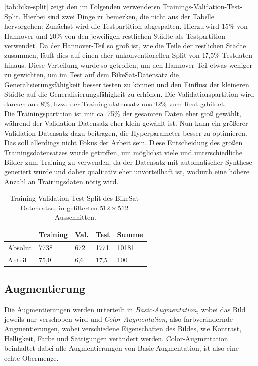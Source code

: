 \autoref{tab:bike-split} zeigt den im Folgenden verwendeten Trainings-Validation-Test-Split. 
Hierbei sind zwei Dinge zu bemerken, die nicht aus der Tabelle hervorgehen: 
Zunächst wird die Testpartition abgespalten. Hierzu wird 15\% von Hannover und 
20\% von den jeweiligen restlichen Städte als Testpartition verwendet. Da der Hannover-Teil so groß ist, wie die Teile der
restlichen Städte zusammen, läuft dies auf einen eher unkonventionellen Split von 17,5\% Testdaten hinaus. Diese Verteilung wurde so getroffen, 
um den Hannover-Teil etwas weniger zu gewichten, um im Test auf dem BikeSat-Datensatz die Generalisierungsfähigkeit besser testen zu können
und den Einfluss der kleineren Städte auf die Generalisierungsfähigkeit zu erhöhen. Die Validationspartition wird danach aus 8\%, 
bzw. der Trainingsdatensatz aus 92\% vom Rest gebildet. \\
Die Trainingspartition ist mit ca. 75\% der gesamten Daten eher groß gewählt, während der Validation-Datensatz eher klein gewählt ist. 
Nun kann ein größerer Validation-Datensatz dazu beitragen, die Hyperparameter besser zu optimieren. Das soll allerdings nicht Fokus der Arbeit sein.
Diese Entscheidung des großen Trainingsdatensatzes wurde getroffen,
um möglichst viele und unterschiedliche Bilder zum Training zu verwenden, da der Datensatz mit automatischer Synthese 
generiert wurde und daher qualitativ eher unvorteilhaft ist, wodurch eine höhere Anzahl an Trainingsdaten nötig wird.

\begin{table}
	\centering
	\begin{tabular}{l|l|l|l|l}
		& Training & Val. & Test & Summe \\
		\midrule
		Absolut & 7738 & 672 & 1771 & 10181 \\
		Anteil & 75,9 & 6,6 & 17,5 & 100 \\ 
	\end{tabular}
	\caption{Training-Validation-Test-Split des BikeSat-Datensatzes in gefilterten $512{\times}512$-Ausschnitten.}
	\label{tab:bike-split}
\end{table}


\subsection{Augmentierung}

Die Augmentierungen werden unterteilt in \textit{Basic-Augmentation}, wobei das Bild jeweils nur verschoben wird und 
\textit{Color-Augmentation}, also farbverändernde Augmentierungen, wobei verschiedene Eigenschaften des Bildes,
wie Kontrast, Helligkeit, Farbe und Sättigungen verändert werden. Color-Augmentation beinhaltet dabei alle 
Augmentierungen von Basic-Augmentation, ist also eine echte Obermenge.

